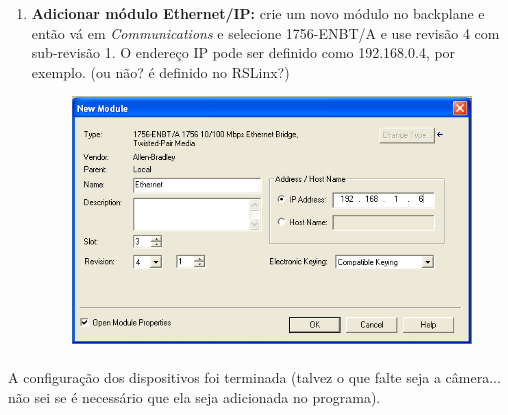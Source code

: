 \documentclass[a4paper,11pt]{scrartcl} %
\numberwithin{equation}{section} %
\numberwithin{figure}{section} %
\numberwithin{table}{section} %
\begin{document}
\begin{enumerate}
\begin{minipage}[!ht]{\linewidth}
\begin{minipage}{0.45\linewidth}
\begin{figure}[H]
          \end{figure}
      \end{minipage}
  \end{minipage}
  
  \item \textbf{Adicionar módulo Ethernet/IP: } crie um novo módulo no backplane e então vá em \textit{Communications} e selecione 1756-ENBT/A e use revisão 4 com sub-revisão 1. O endereço IP pode ser definido como 192.168.0.4, por exemplo. (ou não? é definido no RSLinx?)
  
       \begin{figure}[H]
       \centering
              \includegraphics[width=0.5\linewidth]{figures/software/step10}
          \end{figure}
\end{enumerate}

\paragraph{} A configuração dos dispositivos foi terminada (talvez o que falte seja a câmera... não sei se é necessário que ela seja adicionada no programa).
\end{document}
